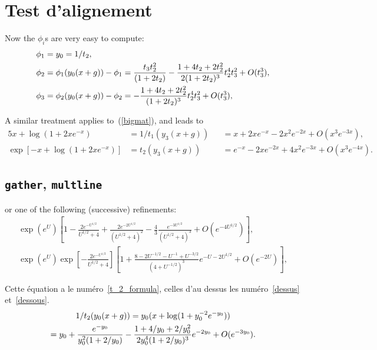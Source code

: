 \documentclass{article}
\numberwithin{equation}{section}
\begin{document}
\section{Test d'alignement}
Now the $\phi_i$s are very easy to compute:
\begin{align*}
\phi_1&  =  y_0 = 1/t_2,\\
\phi_2&  = \phi_1(y_0(x+g))-\phi_1 = {t_3t_2^2\over(1+2t_2)}
-{1+4t_2+2t_2^2\over2(1+2t_2)^3}t_2^4t_3^2+O(t_3^3),\\
\phi_3&  = \phi_2(y_0(x+g))-\phi_2 = -{1+4t_2+2t_2^2\over(1+2t_2)^3}t_2^4t_3^2+O(t_3^3),
\end{align*}

A similar treatment applies to~(\ref{bigmat}), and leads to
\begin{alignat*}{5}
x+\log(1+2xe^{-x})&  =  1/t_1(y_3(x+g))&&  =  x+2xe^{-x}-2x^2e^{-2x}+O(x^3e^{-3x}),\\
\exp[-x+\log(1+2xe^{-x})]&  =  t_2(y_3(x+g))&&  =  e^{-x}-2xe^{-2x}+4x^2e^{-3x}+O(x^3e^{-4x}).
\end{alignat*}

\subsection{\texttt{gather}, \texttt{multline}}
or one of the following (successive) refinements:
\begin{gather}\label{dessus}
\exp(e^U)\left[1-\frac{2e^{-U^{1/2}}}{U^{1/2}+4}
+\frac{2e^{-2U^{1/2}}}{(U^{1/2}+4)^2}
-\frac{4}{3}\frac{e^{-3U^{1/2}}}{(U^{1/2}+4)^3}+O(e^{-4U^{1/2}})\right],\\
\exp(e^U)\exp[-\frac{2e^{-U^{1/2}}}{U^{1/2}+4}]\left[1+
\frac{8-2U^{-1/2}-U^{-1}+U^{-3/2}}{(4+U^{-1/2})^3}
e^{-U-2U^{1/2}}+O(e^{-2U})\right],\label{dessous}
\end{gather}

Cette \'equation a le num\'ero~\ref{t_2_formula}, celles d'au dessus les
num\'ero~\ref{dessus} et~\ref{dessous}.
\begin{multline}	\label{t_2_formula}
1/t_2(y_0(x+g)) = y_0(x+\log(1+y_0^{-2}e^{-y_0}))\\
 = y_0+{e^{-y_0}\over y_0^2(1+2/y_0)}
-{1+4/y_0+2/y_0^2\over 2y_0^4(1+2/y_0)^3}e^{-2y_0}+O(e^{-3y_0}).
\end{multline}
\end{document}
